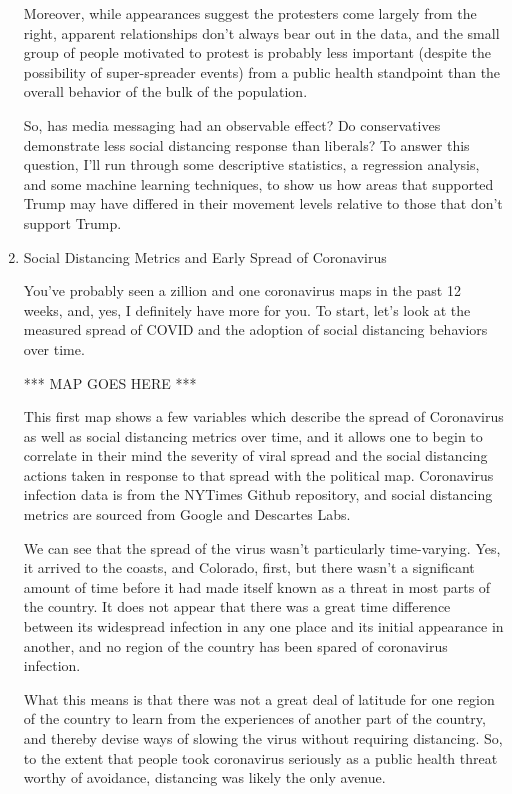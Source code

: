 \documentclass{article}
\begin{document}
\begin{enumerate}
	Moreover, while appearances suggest the protesters come largely from the right, apparent relationships don't always bear out in the data, and the small group of people motivated to protest is probably less important (despite the possibility of super-spreader events) from a public health standpoint than the overall behavior of the bulk of the population.  
	
	So, has media messaging had an observable effect? Do conservatives demonstrate less social distancing response than liberals? To answer this question, I'll run through some descriptive statistics, a regression analysis, and some machine learning techniques, to show us how areas that supported Trump may have differed in their movement levels relative to those that don't support Trump.
	
	\item Social Distancing Metrics and Early Spread of Coronavirus
	
	You've probably seen a zillion and one coronavirus maps in the past 12 weeks, and, yes, I definitely have more for you. To start, let's look at the measured spread of COVID and the adoption of social distancing behaviors over time.
	
	*** MAP GOES HERE ***
	
	This first map shows a few variables which describe the spread of Coronavirus as well as social distancing metrics over time, and it allows one to begin to correlate in their mind the severity of viral spread and the social distancing actions taken in response to that spread with the political map. Coronavirus infection data is from the NYTimes Github repository, and social distancing metrics are sourced from Google and Descartes Labs.
	
	We can see that the spread of the virus wasn't particularly time-varying. Yes, it arrived to the coasts, and Colorado, first, but there wasn't a significant amount of time before it had made itself known as a threat in most parts of the country. It does not appear that there was a great time difference between its widespread infection in any one place and its initial appearance in another, and no region of the country has been spared of coronavirus infection.
	
	What this means is that there was not a great deal of latitude for one region of the country to learn from the experiences of another part of the country, and thereby devise ways of slowing the virus without requiring distancing. So, to the extent that people took coronavirus seriously as a public health threat worthy of avoidance, distancing was likely the only avenue.
	

\end{enumerate}
\end{document}
